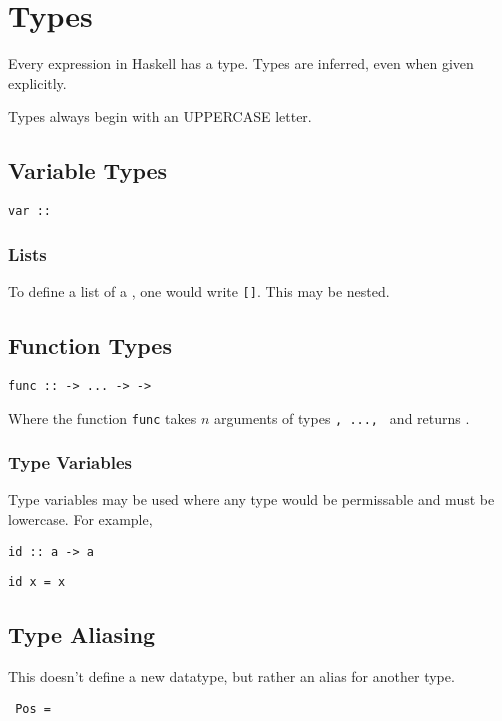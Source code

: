 \section{Types}

Every expression in Haskell has a type. Types are inferred, even when given explicitly.

Types always begin with an UPPERCASE letter.

\subsection{Variable Types}

\begin{center}
  \texttt{var :: }
\end{center}

\subsubsection{Lists}

To define a list of a \texttt{}, one would write \texttt{[]}. This may be nested.

\subsection{Function Types}

\begin{center}
  \texttt{func ::  -> ... ->  -> }
\end{center}

Where the function \texttt{func} takes $n$ arguments of types \texttt{, ..., } and returns \texttt{}.

\subsubsection{Type Variables}

Type variables may be used where any type would be permissable and must be lowercase. For example,

\begin{center}
  \texttt{id :: a -> a}

  \texttt{id x = x}
\end{center}

\subsection{Type Aliasing}
This doesn't define a new datatype, but rather an alias for another type.
\begin{center}
  \texttt{ Pos = }
\end{center}


